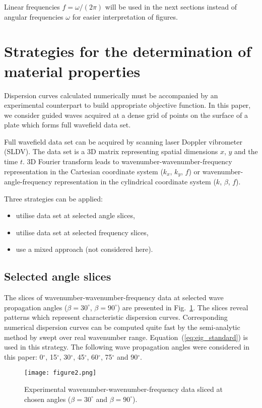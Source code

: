 \documentclass[preprint,12pt]{elsarticle}
\begin{document}
Linear frequencies $f=\omega/(2 \pi)$ will be used in the next sections instead of angular frequencies $\omega$ for easier interpretation of figures.
\section{Strategies for the determination of material properties \label{sec:strategies}}
Dispersion curves calculated numerically must be accompanied by an experimental counterpart to build appropriate objective function. 
In this paper, we consider guided waves acquired at a dense grid of points on the surface of a plate which forms full wavefield data set. 

Full wavefield data set can be acquired by scanning laser Doppler vibrometer (SLDV).
The data set is a 3D matrix representing spatial dimensions $x$, $y$ and the time $t$. 
3D Fourier transform leads to wavenumber-wavenumber-frequency representation  in the Cartesian coordinate system ($k_x$, $k_y$, $f$) or wavenumber-angle-frequency representation  in the cylindrical coordinate system ($k$, $\beta$, $f$).

Three strategies can be applied:
\begin{itemize}
	\item utilise data set at selected angle slices,
	\item utilise data set at selected frequency slices,
	\item use a mixed approach (not considered here).
\end{itemize}
\subsection{Selected angle slices}
The slices of wavenumber-wavenumber-frequency data at selected wave propagation angles ($\beta=30^{\circ}$, $\beta=90^{\circ}$) are presented in Fig.~\ref{fig:angle_slice}. 
The slices reveal patterns which represent characteristic dispersion curves. 
Corresponding numerical dispersion curves can be computed quite fast by the semi-analytic method by swept over real wavenumber range.
Equation~(\ref{eq:eig_standard}) is used in this strategy.
The following wave propagation angles were considered in this paper: 0$^{\circ}$, 15$^{\circ}$, 30$^{\circ}$, 45$^{\circ}$, 60$^{\circ}$, 75$^{\circ}$ and 90$^{\circ}$.
\begin{figure} [h!]
	\centering
	\texttt{[image: figure2.png]}	
	\caption{Experimental wavenumber-wavenumber-frequency data sliced at chosen angles ($\beta=30^{\circ}$ and $\beta=90^{\circ}$).}
	\label{fig:angle_slice}
\end{figure}
\end{document}
